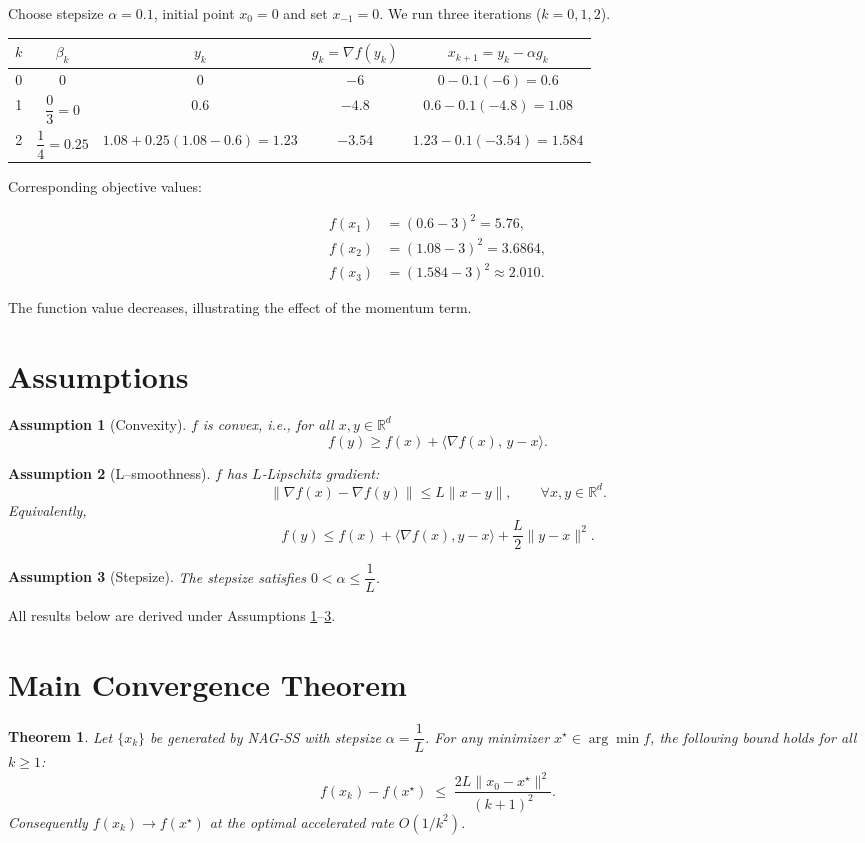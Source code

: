 \documentclass{article}
\newtheorem{theorem}{Theorem}
\newtheorem{assumption}{Assumption}
\newcommand{\grad}{\nabla}
\newcommand{\R}{\mathbb{R}}
\begin{document}
Choose stepsize $\alpha=0.1$, initial point $x_0=0$ and set $x_{-1}=0$.
We run three iterations ($k=0,1,2$).

\begin{center}
\begin{tabular}{c|c|c|c|c}
$k$ & $\beta_k$ & $y_k$ & $g_k=\grad f(y_k)$ & $x_{k+1}=y_k-\alpha g_k$ \\ \hline
0 & $0$ & $0$ & $-6$ & $0-0.1(-6)=0.6$ \\
1 & $\dfrac{0}{3}=0$ & $0.6$ & $-4.8$ & $0.6-0.1(-4.8)=1.08$ \\
2 & $\dfrac{1}{4}=0.25$ & $1.08+0.25(1.08-0.6)=1.23$ & $-3.54$ & $1.23-0.1(-3.54)=1.584$ 
\end{tabular}
\end{center}

Corresponding objective values:

\[
\begin{aligned}
f(x_1)&=(0.6-3)^2=5.76,\\
f(x_2)&=(1.08-3)^2=3.6864,\\
f(x_3)&=(1.584-3)^2\approx 2.010.
\end{aligned}
\]

The function value decreases, illustrating the effect of the momentum term.

\newpage
\section*{Assumptions}
\begin{assumption}[Convexity]\label{ass:convex}
$f$ is convex, i.e., for all $x,y\in\R^d$
\[
f(y)\ge f(x)+\langle \grad f(x),\,y-x\rangle .
\]
\end{assumption}

\begin{assumption}[L–smoothness]\label{ass:smooth}
$f$ has $L$‑Lipschitz gradient:
\[
\|\grad f(x)-\grad f(y)\|\le L\|x-y\|,\qquad\forall x,y\in\R^d .
\]
Equivalently,
\[
f(y)\le f(x)+\langle \grad f(x),y-x\rangle+\frac{L}{2}\|y-x\|^2 .
\]
\end{assumption}

\begin{assumption}[Stepsize]\label{ass:step}
The stepsize satisfies $0<\alpha\le \dfrac{1}{L}$.
\end{assumption}

All results below are derived under Assumptions \ref{ass:convex}–\ref{ass:step}.

\section*{Main Convergence Theorem}
\begin{theorem}\label{thm:rate}
Let $\{x_k\}$ be generated by NAG‑SS with stepsize $\alpha=\dfrac{1}{L}$.
For any minimizer $x^\star\in\arg\min f$, the following bound holds for all $k\ge 1$:
\[
f(x_k)-f(x^\star)\;\le\;\frac{2L\|x_0-x^\star\|^2}{(k+1)^2}.
\]
Consequently $f(x_k)\to f(x^\star)$ at the optimal accelerated rate $O(1/k^2)$.
\end{theorem}
\end{document}
